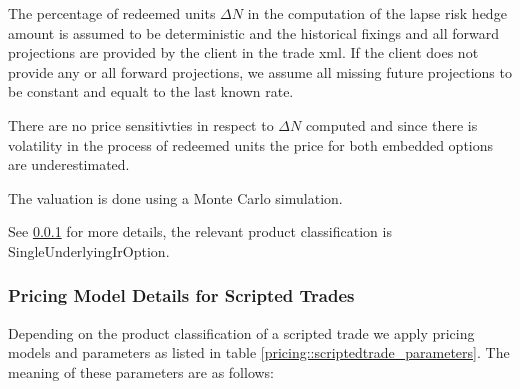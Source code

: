 The percentage of redeemed units $\Delta N$ in the computation of the lapse risk hedge amount is assumed to be deterministic and 
the historical fixings and all forward projections are provided by the client in the trade xml. If the client does not provide any or all forward projections, we assume all missing future projections to be constant and equalt to the last known rate.

There are no price sensitivties in respect to $\Delta N$ computed and since there is volatility in the process of redeemed units the price for both embedded options are underestimated.

The valuation is done using a Monte Carlo simulation.

See \ref{pricing::scriptedtrade_mc} for more details, the relevant product classification is SingleUnderlyingIrOption.

\subsubsection{Pricing Model Details for Scripted Trades}\label{pricing::scriptedtrade_mc}

Depending on the product classification of a scripted trade we apply pricing models and parameters as listed in table
\ref{pricing::scriptedtrade_parameters}. The meaning of these parameters are as follows:

